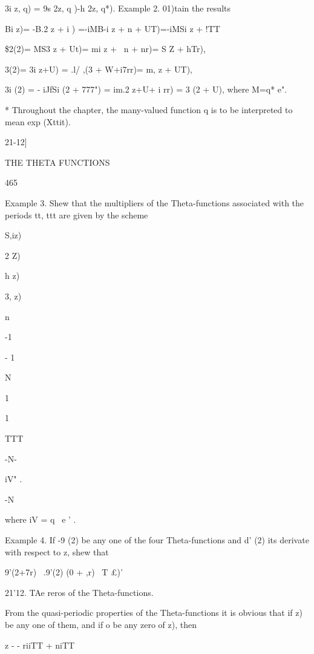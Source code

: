 3i z, q) = 9s 2z, q )-h 2z, q*). Example 2. 01)tain the results

Bi z)= -B.2 z + i ) =-iMB-i z + n + UT)=-iMSi z + !TT\

\$2(2)= MS3 z + Ut)= mi z + \ n + nr)= S Z + hTr),

 3(2)= 3i z+U) = .l/ ,(3 + W+i7rr)= m, z + UT),

3i (2) = - iJfSi (2 + 777") = im.2 z+U+ i rr) = 3 (2 + U), where M=q*
e".

* Throughout the chapter, the many-valued function q is to be
interpreted to mean exp (Xttit).



21-12]



THE THETA FUNCTIONS



465



Example 3. Shew that the multipliers of the Theta-functions associated
with the periods tt, ttt are given by the scheme





S,iz)


 2 Z)


h z)


3, z)


n


-1


- 1

N


1


1


TTT


-N-


iV" .


-N



where iV = q~ e ' .

Example 4. If -9 (2) be any one of the four Theta-functions and d' (2)
its derivate with respect to z, shew that



 9'(2+7r) \ .9'(2) (0 + ,r) ~T £)'






21'12. TAe reros of the Theta-functions.

From the quasi-periodic properties of the Theta-functions it is
obvious that if z) be any one of them, and if o be any zero of z),
then

z - - riiTT + niTT

